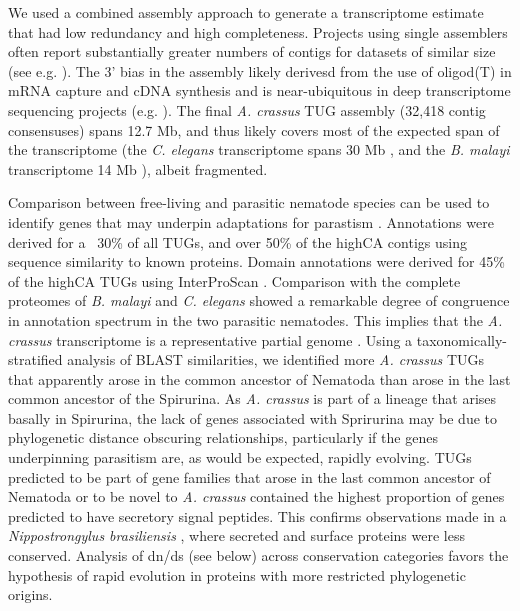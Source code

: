 \documentclass[10pt]{bmc_article}
\newenvironment{bmcformat}{\begin{raggedright}\baselineskip20pt\sloppy\setboolean{publ}{false}}{\end{raggedright}\baselineskip20pt\sloppy}
\begin{document}
\begin{bmcformat}
We used a combined assembly approach \cite{pmid20950480} to generate a
transcriptome estimate that had low redundancy and high
completeness. Projects using single assemblers often report
substantially greater numbers of contigs for datasets of similar size
(see e.g. \cite{pmid21364769}). The 3’ bias in the assembly likely
derivesd from the use of oligod(T) in mRNA capture and cDNA synthesis
and is near-ubiquitous in deep transcriptome sequencing projects (e.g.
\cite{pmid20331785}). The final \textit{A. crassus} TUG assembly
(32,418 contig consensuses) spans 12.7 Mb, and thus likely covers most
of the expected span of the transcriptome (the \textit{C. elegans}
transcriptome spans 30 Mb \cite{pmid9851916}, and the
\textit{B. malayi} transcriptome 14 Mb \cite{ghedin_draft_2007}),
albeit fragmented.

Comparison between free-living and parasitic nematode species can be
used to identify genes that may underpin adaptations for parastism
\cite{parkinson_transcriptomic_2004, wasmuth_extent_2008}. Annotations
were derived for a ~30\% of all TUGs, and over 50\% of the highCA
contigs using sequence similarity to known proteins. Domain
annotations were derived for 45\% of the highCA TUGs using
InterProScan \cite{pmid11590104}. Comparison with the complete
proteomes of \textit{B. malayi} and \textit{C. elegans} showed a
remarkable degree of congruence in annotation spectrum in the two
parasitic nematodes. This implies that the \textit{A. crassus}
transcriptome is a representative partial genome
\cite{parkinson_partigene--constructing_2004}. Using a
taxonomically-stratified analysis of BLAST similarities, we identified
more \textit{A. crassus} TUGs that apparently arose in the common
ancestor of Nematoda than arose in the last common ancestor of the
Spirurina. As \textit{A. crassus} is part of a lineage that arises
basally in Spirurina, the lack of genes associated with Sprirurina may
be due to phylogenetic distance obscuring relationships, particularly
if the genes underpinning parasitism are, as would be expected,
rapidly evolving. TUGs predicted to be part of gene families that
arose in the last common ancestor of Nematoda or to be novel to
\textit{A. crassus} contained the highest proportion of genes
predicted to have secretory signal peptides. This confirms
observations made in a \textit{Nippostrongylus brasiliensis}
\cite{harcus_signal_2004}, where secreted and surface proteins were
less conserved. Analysis of dn/ds (see below) across conservation
categories favors the hypothesis of rapid evolution in proteins with
more restricted phylogenetic origins.


\end{bmcformat}
\end{document}
